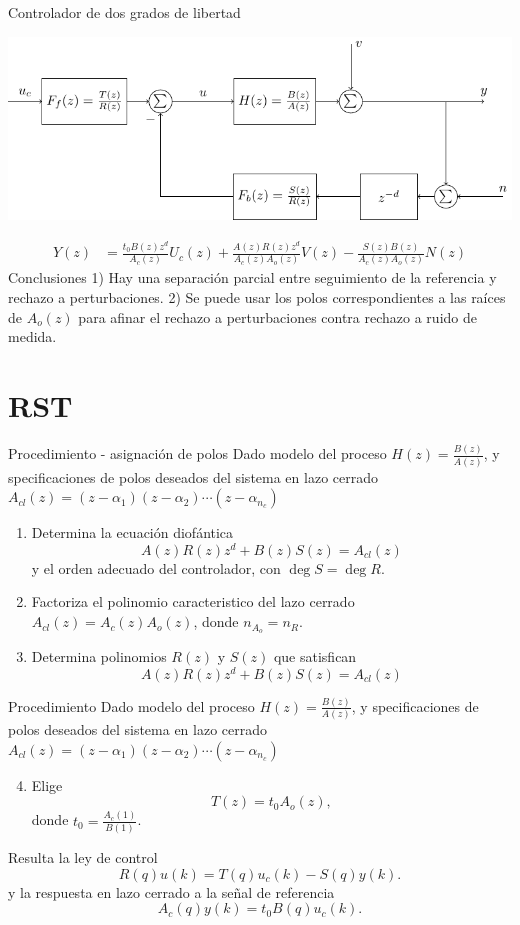 \documentclass[presentation,aspectratio=169]{beamer}
\begin{document}
\begin{frame}[label={sec:org29d1711}]{Controlador de dos grados de libertad}
\begin{center}
\includegraphics[width=0.7\linewidth]{../../figures/2dof-block-explicit}
\end{center}
\begin{align*}
Y(z) &= \frac{t_0B(z)z^d}{A_c(z)}U_c(z) + \frac{A(z)R(z)z^d}{A_c(z)A_o(z)}V(z)- \frac{S(z)B(z)}{A_c(z)A_o(z)}N(z)
\end{align*}
\alert{Conclusiones} 1) Hay una separación parcial entre seguimiento de la referencia y rechazo a perturbaciones. 2) Se puede usar los polos correspondientes a las raíces de \(A_o(z)\) para afinar el rechazo a perturbaciones contra rechazo a ruido de medida. 
\end{frame}


\section{RST}
\label{sec:org427d3b8}

\begin{frame}[label={sec:orgcbf1ef7}]{Procedimiento - asignación de polos}
Dado modelo del proceso \(H(z)=\frac{B(z)}{A(z)}\), y specificaciones de polos deseados del sistema en lazo cerrado \(A_{cl}(z) = (z-\alpha_1)(z-\alpha_2) \cdots (z-\alpha_{n_c})\)
\begin{enumerate}
\item Determina la ecuación diofántica
\[ A(z)R(z)z^{d} + B(z)S(z) = A_{cl}(z) \]
y el orden adecuado del controlador, con \(\deg S = \deg R\).
\item Factoriza el polinomio caracteristico del lazo cerrado \(A_{cl}(z) = A_c(z)A_o(z)\), donde \(n_{A_o} = n_R\).
\item Determina polinomios \(R(z)\) y \(S(z)\) que satisfican
\[ A(z)R(z)z^{d} + B(z)S(z) = A_{cl}(z) \]
\end{enumerate}
\end{frame}

\begin{frame}[label={sec:orgee46d18}]{Procedimiento}
Dado modelo del proceso \(H(z)=\frac{B(z)}{A(z)}\), y specificaciones de polos deseados del sistema en lazo cerrado \(A_{cl}(z) = (z-\alpha_1)(z-\alpha_2) \cdots (z-\alpha_{n_c})\)
\begin{enumerate}
\setcounter{enumi}{3}
\item Elige
\[T(z) = t_0 A_o(z),\] donde \(t_0 = \frac{A_c(1)}{B(1)}\).
\end{enumerate}

Resulta la ley de control 
\[ R(q) u(k) = T(q)u_c(k) - S(q)y(k). \]
y la respuesta en lazo cerrado a la señal de referencia
\[ A_c(q)y(k) = t_0 B(q) u_c(k). \]
\end{frame}
\end{document}
